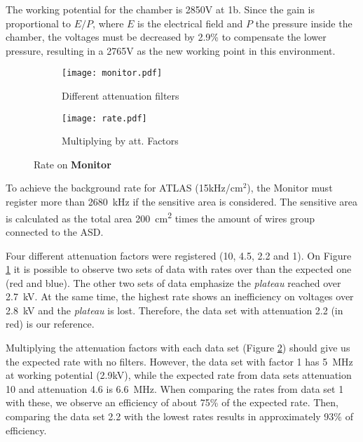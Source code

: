 The working potential for the chamber is 2850V at \unit{1}{b}. Since the gain is proportional to $E/P$, where $E$ is
the electrical field and $P$ the pressure inside the chamber, the voltages must be decreased by 2.9\% to compensate
the lower pressure, resulting in a 2765V as the new working point in this environment.\par 

\begin{figure}[t]
	\hspace*{\fill}
	\begin{subfigure}[b]{0.45\textwidth}
		\centering
		\texttt{[image: monitor.pdf]}
		\caption{Different attenuation filters}\label{fig:monrate}
	\end{subfigure}
	\hfill
	\begin{subfigure}[b]{0.45\textwidth}
		\centering
		\texttt{[image: rate.pdf]}
		\caption{Multiplying by att. Factors}\label{fig:filters}
	\end{subfigure}
	\hspace*{\fill}
	\caption{Rate on {\bf Monitor}}\label{}
\end{figure}

To achieve the background rate for ATLAS (\unit{15}{kHz/cm$^2$}), the Monitor must register more than \SI{2680}{kHz} if
the sensitive area is considered. The sensitive area is calculated as the total area \SI{200}{cm^2} times the amount of
wires group connected to the ASD.\par

Four different attenuation factors were registered (10, 4.5, 2.2 and 1). On Figure \ref{fig:monrate} it is possible to
observe two sets of data with rates over than the expected one (red and blue). The other two sets of data emphasize the
{\it plateau} reached over \SI{2.7}{kV}. At the same time, the highest rate shows an inefficiency on voltages over
\SI{2.8}{kV} and the {\it plateau} is lost. Therefore, the data set with attenuation 2.2 (in red) is our reference.\par

Multiplying the attenuation factors with each data set (Figure \ref{fig:filters}) should give us the expected rate with
no filters. However, the data set with factor 1 has \SI{5}{MHz} at working potential (2.9kV), while the expected rate
from data sets attenuation 10 and attenuation 4.6 is \SI{6.6}{MHz}. When comparing the rates from data set 1 with these,
we observe an efficiency of about 75\% of the  expected rate. Then, comparing the data set 2.2 with the lowest rates
results in approximately 93\% of efficiency.\par

